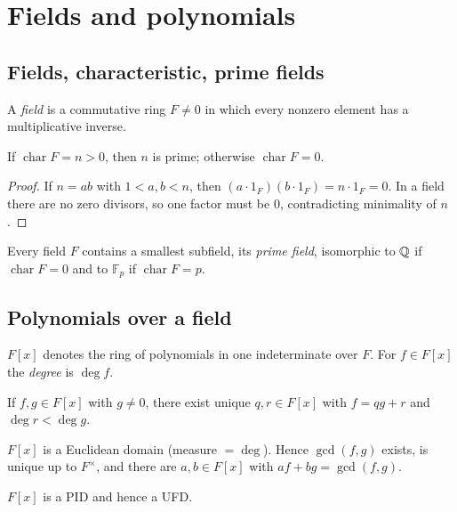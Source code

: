 \section{Fields and polynomials}

\subsection{Fields, characteristic, prime fields}
\begin{definition}
A \emph{field} is a commutative ring $F\neq 0$ in which every nonzero element has a multiplicative inverse.
\end{definition}
\begin{proposition}
If $\operatorname{char}F=n>0$, then $n$ is prime; otherwise $\operatorname{char}F=0$.
\end{proposition}
\begin{proof}
If $n=ab$ with $1<a,b<n$, then $(a\cdot 1_F)(b\cdot 1_F)=n\cdot 1_F=0$. In a field there are no zero divisors, so one factor must be $0$, contradicting minimality of $n$.
\end{proof}
\begin{proposition}
Every field $F$ contains a smallest subfield, its \emph{prime field}, isomorphic to $\mathbb{Q}$ if $\operatorname{char}F=0$ and to $\mathbb{F}_p$ if $\operatorname{char}F=p$.
\end{proposition}

\subsection{Polynomials over a field}
\begin{definition}
$F[x]$ denotes the ring of polynomials in one indeterminate over $F$. For $f\in F[x]$ the \emph{degree} is $\deg f$.
\end{definition}
\begin{proposition}
If $f,g\in F[x]$ with $g\neq 0$, there exist unique $q,r\in F[x]$ with $f=qg+r$ and $\deg r<\deg g$.
\end{proposition}
\begin{corollary}
$F[x]$ is a Euclidean domain (measure $=\deg$). Hence $\gcd(f,g)$ exists, is unique up to $F^\times$, and there are $a,b\in F[x]$ with $af+bg=\gcd(f,g)$.
\end{corollary}
\begin{proposition}
$F[x]$ is a PID and hence a UFD.
\end{proposition}

